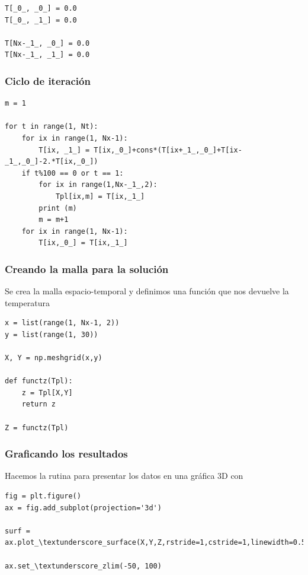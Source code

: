 \documentclass[12pt]{beamer}
\begin{document}
{\begin{frame}
\begin{lstlisting}[caption=Se definen las condiciones iniciales y de frontera, style=FormattedNumber, basicstyle=\linespread{1.1}\ttfamily=\small, columns=fullflexible]
T[_0_, _0_] = 0.0
T[_0_, _1_] = 0.0

T[Nx-_1_, _0_] = 0.0
T[Nx-_1_, _1_] = 0.0
\end{lstlisting}
\end{frame}
\begin{frame}
\frametitle{Ciclo de iteración}
\begin{lstlisting}[caption=Ciclo de iteración para calcular los nuevos valores de temperatura, style=FormattedNumber, basicstyle=\linespread{1.1}\ttfamily=\small, columns=fullflexible]
m = 1

for t in range(1, Nt):
    for ix in range(1, Nx-1):
        T[ix, _1_] = T[ix,_0_]+cons*(T[ix+_1_,_0_]+T[ix-_1_,_0_]-2.*T[ix,_0_])
    if t%100 == 0 or t == 1:
        for ix in range(1,Nx-_1_,2):
            Tpl[ix,m] = T[ix,_1_]
        print (m)
        m = m+1
    for ix in range(1, Nx-1):
        T[ix,_0_] = T[ix,_1_]
\end{lstlisting}
\end{frame}
\begin{frame}
\frametitle{Creando la malla para la solución}
Se crea la malla espacio-temporal y definimos una función que nos devuelve la temperatura
\begin{lstlisting}[caption=Definición de la malla, style=FormattedNumber, basicstyle=\linespread{1.1}\ttfamily=\small, columns=fullflexible]
x = list(range(1, Nx-1, 2))
y = list(range(1, 30))

X, Y = np.meshgrid(x,y)

def functz(Tpl):
    z = Tpl[X,Y]
    return z
    
Z = functz(Tpl)
\end{lstlisting}
\end{frame}
\begin{frame}
\frametitle{Graficando los resultados}
Hacemos la rutina para presentar los datos en una gráfica 3D con 
\begin{lstlisting}[caption=Rutina para graficar los resultados, style=FormattedNumber, basicstyle=\linespread{1.1}\ttfamily=\small, columns=fullflexible]
fig = plt.figure()
ax = fig.add_subplot(projection='3d')

surf = ax.plot_\textunderscore_surface(X,Y,Z,rstride=1,cstride=1,linewidth=0.5,cmap=cm.hot_\textunderscore_r)

ax.set_\textunderscore_zlim(-50, 100)


\end{lstlisting}
\end{frame}}
\end{document}
